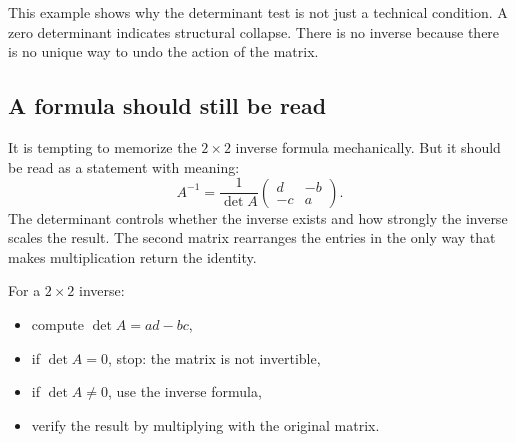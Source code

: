 This example shows why the determinant test is not just a technical condition. A zero determinant indicates structural collapse. There is no inverse because there is no unique way to undo the action of the matrix.

\subsection{A formula should still be read}

It is tempting to memorize the \(2\times2\) inverse formula mechanically. But it should be read as a statement with meaning:
\[
A^{-1}=\frac{1}{\det A}\begin{pmatrix}d&-b\\-c&a\end{pmatrix}.
\]
The determinant controls whether the inverse exists and how strongly the inverse scales the result. The second matrix rearranges the entries in the only way that makes multiplication return the identity.

\begin{summarybox}
For a \(2\times2\) inverse:
\begin{itemize}
\item compute \(\det A=ad-bc\),
\item if \(\det A=0\), stop: the matrix is not invertible,
\item if \(\det A\ne0\), use the inverse formula,
\item verify the result by multiplying with the original matrix.
\end{itemize}
\end{summarybox}
